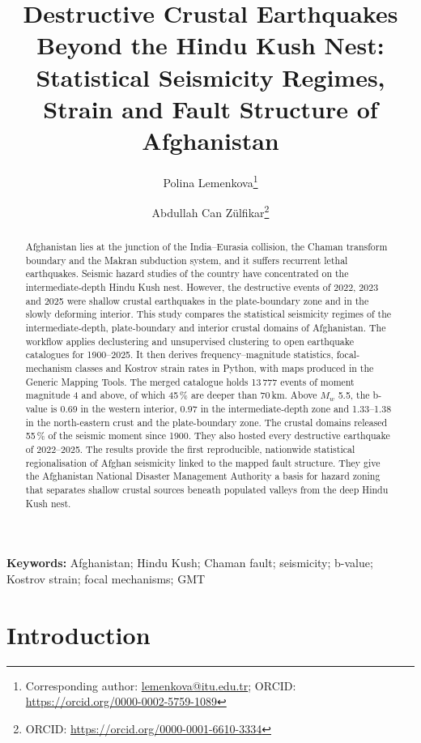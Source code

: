 \documentclass[11pt]{article}
\title{Destructive Crustal Earthquakes Beyond the Hindu Kush Nest: Statistical
Seismicity Regimes, Strain and Fault Structure of Afghanistan}
\author[1]{Polina Lemenkova\thanks{Corresponding author:
\href{mailto:lemenkova@itu.edu.tr}{lemenkova@itu.edu.tr};
ORCID: \url{https://orcid.org/0000-0002-5759-1089}}}
\author[1]{Abdullah Can Z\"{u}lfikar\thanks{ORCID:
\url{https://orcid.org/0000-0001-6610-3334}}}
\affil[1]{Disaster and Emergency Management Department, Institute of Earthquake
Engineering and Disaster Management, Istanbul Technical University, Maslak,
34469 Istanbul, T\"{u}rkiye}
\date{}
\begin{document}
\maketitle

\begin{abstract}
\noindent
Afghanistan lies at the junction of the India--Eurasia collision, the Chaman
transform boundary and the Makran subduction system, and it suffers recurrent
lethal earthquakes. Seismic hazard studies of the country have concentrated on the
intermediate-depth Hindu Kush nest. However, the destructive events of 2022, 2023
and 2025 were shallow crustal earthquakes in the plate-boundary zone and in the
slowly deforming interior. This study compares the statistical seismicity regimes of
the intermediate-depth, plate-boundary and interior crustal domains of Afghanistan.
The workflow applies declustering and unsupervised clustering to open earthquake
catalogues for 1900--2025. It then derives frequency--magnitude statistics,
focal-mechanism classes and Kostrov strain rates in Python, with maps produced in
the Generic Mapping Tools. The merged catalogue holds
13\,777 events of moment magnitude 4 and above, of which 45\,\% are deeper than
70\,km. Above $M_w$ 5.5, the b-value is 0.69 in the western interior, 0.97 in the
intermediate-depth zone and 1.33--1.38 in the north-eastern crust and the
plate-boundary zone. The crustal domains released 55\,\% of the seismic moment
since 1900. They also hosted every destructive earthquake of 2022--2025. The results provide the first reproducible, nationwide statistical
regionalisation of Afghan seismicity linked to the mapped fault structure.
They give the Afghanistan National Disaster Management Authority a basis for
hazard zoning that separates shallow crustal sources beneath populated valleys
from the deep Hindu Kush nest.
\end{abstract}

\noindent\textbf{Keywords:} Afghanistan; Hindu Kush; Chaman fault; seismicity;
b-value; Kostrov strain; focal mechanisms; GMT

\section{Introduction}\label{sec:intro}
\end{document}
